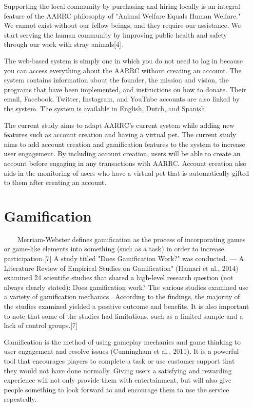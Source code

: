 Supporting the local community by purchasing and hiring locally is an integral feature of the AARRC philosophy of "Animal Welfare Equals Human Welfare." We cannot exist without our fellow beings, and they require our assistance. We start serving the human community by improving public health and safety through our work with stray animals[4].

The web-based system is simply one in which you do not need to log in because you can access everything about the AARRC without creating an account. The system contains information about the founder, the mission and vision, the programs that have been implemented, and instructions on how to donate. Their email, Facebook, Twitter, Instagram, and YouTube accounts are also linked by the system. The system is available in English, Dutch, and Spanish.

The current study aims to adapt AARRC's current system while adding new features such as account creation and having a virtual pet. The current study aims to add account creation and gamification features to the system to increase user engagement. By including account creation, users will be able to create an account before engaging in any transactions with AARRC. Account creation also aids in the monitoring of users who have a virtual pet that is automatically gifted to them after creating an account.

\section{Gamification}

~~~~Merriam-Webster defines gamification as the process of incorporating games or game-like elements into something (such as a task) in order to increase participation.[7]  A study titled "Does Gamification Work?" was conducted. — A Literature Review of Empirical Studies on Gamification" (Hamari et al., 2014) examined 24 scientific studies that shared a high-level research question (not always clearly stated): Does gamification work? The various studies examined use a variety of gamification mechanics . According to the findings, the majority of the studies examined yielded a positive outcome and benefits. It is also important to note that some of the studies had limitations, such as a limited sample and a lack of control groups.[7] 

Gamification is the method of using gameplay mechanics and game thinking to user engagement and resolve issues (Cunningham et al., 2011). It is a powerful tool that encourages players to complete a task or use customer support that they would not have done normally. Giving users a satisfying and rewarding experience will not only provide them with entertainment, but will also give people something to look forward to and encourage them to use the service repeatedly.

